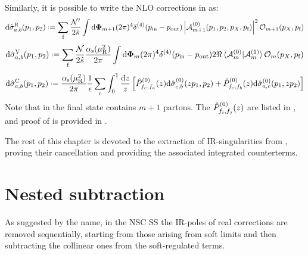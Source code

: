 Similarly, it is possible to write the NLO corrections in  as:
\begin{equation}
  \dd\pcs_{a,b}^\text{R}(p_1 , p_2) \defeq \sum_\text{f} \frac{\mathcal{N}'}{2\hat{s}} \int \lps_{m+1} (2\pi)^4 \delta^{(4)}(p_\text{in} - p_\text{out}) \abs{\ampl^{(0)}_{m+1}(p_1, p_2, p_X, p_\text{f})}^2 \op_{m+1}(p_X, p_\text{f})
  \label{eq:real-cs}
\end{equation}
\begin{equation}
  \dd\pcs_{a,b}^\text{V}(p_1 , p_2) \defeq \sum_\text{f} \frac{\mathcal{N}}{2\hat{s}} \frac{\rcr}{2\pi} \int \lps_m (2\pi)^4 \delta^{(4)}(p_\text{in} - p_\text{out}) 2\Re \braket{\ampl_m^{(0)} | \ampl_m^{(1)}} \op_m(p_X, p_\text{f})
  \label{eq:virt-cs}
\end{equation}
\begin{equation}
  \dd\pcs_{a,b}^\text{C}(p_1 , p_2) \defeq \frac{\rcr}{2\pi} \frac{1}{\de} \sum_c \int_0^1 \frac{\dd z}{z} \left[ \ap_{f_c,f_a}(z) \dd\pcs_{c,b}^{(0)}(z p_1 , p_2) + \ap_{f_c,f_b}(z) \dd\pcs_{a,c}^{(0)}(p_1 , z p_2) \right]
  \label{eq:pdf-cs}
\end{equation}
Note that in  the final state contains $ m + 1 $ partons. The  $ \hat{P}^{(0)}_{f_i , f_j}(z) $ are listed in , and proof of  is provided in .

The rest of this chapter is devoted to the extraction of IR-singularities from , proving their cancellation and providing the associated integrated counterterms.

\section{Nested subtraction}

As suggested by the name, in the NSC SS the IR-poles of real corrections are removed sequentially, starting from those arising from soft limits and then subtracting the collinear ones from the soft-regulated terms.

